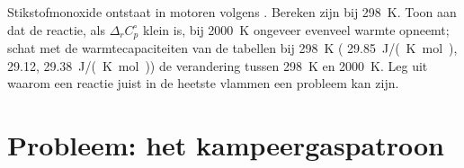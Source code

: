\begin{exercise}[$\star\star\star$]\label{exo:b2:reaction-enthalpy:12}
Stikstofmonoxide ontstaat in motoren volgens .
Bereken zijn  bij \qty{298}{K}. Toon aan dat de reactie,
als $\Delta_r C_p^\circ$ klein is, bij \qty{2000}{K} ongeveer evenveel warmte
opneemt; schat met de warmtecapaciteiten van de tabellen bij \qty{298}{K}
( \qty{29.85}{J/(K.mol)},  29.12, 
\qty{29.38}{J/(K.mol)}) de verandering tussen
\qty{298}{K} en \qty{2000}{K}. Leg uit waarom een  reactie juist
in de heetste vlammen een probleem kan zijn.
\end{exercise}

\section{Probleem: het kampeergaspatroon}


